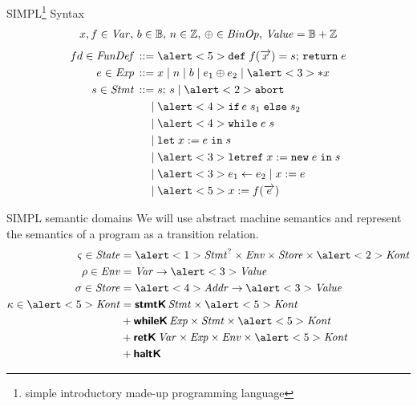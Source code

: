 \documentclass[aspectratio=169]{beamer}
\begin{document}
\begin{frame}{SIMPL\footnote{simple introductory made-up programming language} Syntax}
  \vspace{-2em}
  \small
  \begin{gather*}
    x,f \in \mathit{Var},\, b \in \mathbb{B},\, n \in \mathbb{Z},\, \oplus \in \mathit{BinOp},\,\mathit{Value} = \mathbb{B} + \mathbb{Z}
  \end{gather*}\vspace{-2em}
  \begin{align*}
    fd \in \ns{FunDef} \eDEF & \alert<5>{\kw{def}\; f(\vo{x}) = s;\,\kw{return}\; e} \\
    e \in \Exp \eDEF & x \eOR n \eOR b \eOR e_1 \oplus e_2 \eOR \alert<3>{*x} \\ %
    s \in \Stmt \eDEF & s;\,s \eOR \alert<2>{\kw{abort}} \\
    \eOR & \alert<4>{\kw{if}\, e\; s_1 \; \kw{else} \; s_2} \\
    \eOR & \alert<4>{\kw{while}\; e\; s} \\
    \eOR & \kw{let}\; x := e \;\kw{in}\;s \\
    \eOR & \alert<3>{\kw{letref}\; x := \kw{new}\;e \;\kw{in}\;s} \\
    \eOR & \alert<3>{e_1 \update e_2} \eOR x := e \\
    \eOR & \alert<5>{x := f(\vo{e})}
  \end{align*}
\end{frame}
\begin{frame}{SIMPL semantic domains}
  \begingroup\footnotesize We will use abstract machine semantics and represent the semantics of a program as a transition relation.\endgroup
\begin{align*}
    \varsigma \in \State & = \alert<1>{\Stmt^? \times \Env \times \Store \times \alert<2>{\Kont}} \\
    \rho \in \Env & = \Var \to \alert<3>{\Value} \\ %
    \sigma \in \Store & = \alert<4>{\Addr} \to \alert<3>{\Value} \\ %
    \kappa \in \alert<5>{\Kont} & = \sTag{stmtK}{\Stmt \times \alert<5>{\Kont}} \\
                         & \disunion \sTag{whileK}{\Exp \times \Stmt \times \alert<5>{\Kont}} \\
                         & \disunion \sTag{retK}{\Var \times \Exp \times \Env \times \alert<5>{\Kont}} \\
                         & \disunion \sTag{haltK}
\end{align*}

\end{frame}
\end{document}
